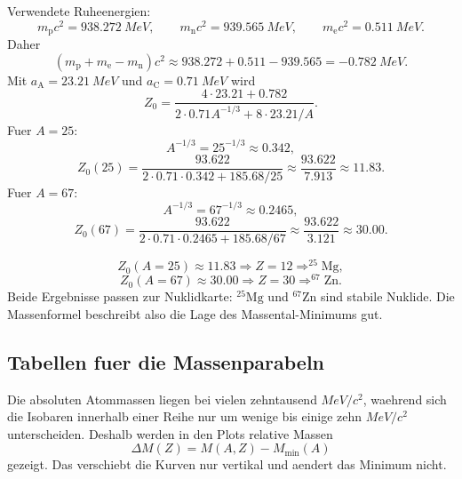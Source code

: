 \documentclass[11pt,a4paper]{scrartcl}
\newcommand{\MeV}{\si{MeV}}
\newcommand{\isotope}[2]{^{#1}\mathrm{#2}}
\theoremstyle{definition}
\theoremstyle{plain}
\theoremstyle{remark}
\newcommand{\aC}{a_{\mathrm C}}
\newcommand{\aA}{a_{\mathrm A}}
\begin{document}
\begin{enumerate}[label=(\alph*)]
    \begin{calculationbox}
    Verwendete Ruheenergien:
    \[
        m_{\mathrm p}c^2=\SI{938.272}{\MeV},\qquad
        m_{\mathrm n}c^2=\SI{939.565}{\MeV},\qquad
        m_{\mathrm e}c^2=\SI{0.511}{\MeV}.
    \]
    Daher
    \[
        (m_{\mathrm p}+m_{\mathrm e}-m_{\mathrm n})c^2
        \approx 938.272+0.511-939.565
        =\SI{-0.782}{\MeV}.
    \]
    Mit $\aA=\SI{23.21}{\MeV}$ und $\aC=\SI{0.71}{\MeV}$ wird
    \[
        Z_0=\frac{4\cdot23.21+0.782}{2\cdot0.71 A^{-1/3}+8\cdot23.21/A}.
    \]
    Fuer $A=25$:
    \[
        A^{-1/3}=25^{-1/3}\approx0.342,
    \]
    \[
        Z_0(25)=\frac{93.622}{2\cdot0.71\cdot0.342+185.68/25}
        \approx\frac{93.622}{7.913}\approx11.83.
    \]
    Fuer $A=67$:
    \[
        A^{-1/3}=67^{-1/3}\approx0.2465,
    \]
    \[
        Z_0(67)=\frac{93.622}{2\cdot0.71\cdot0.2465+185.68/67}
        \approx\frac{93.622}{3.121}\approx30.00.
    \]
    \end{calculationbox}

    \begin{answerbox}
    \[
        \boxed{Z_0(A=25)\approx11.83\Rightarrow Z=12\Rightarrow \isotope{25}{Mg}},
    \]
    \[
        \boxed{Z_0(A=67)\approx30.00\Rightarrow Z=30\Rightarrow \isotope{67}{Zn}}.
    \]
    Beide Ergebnisse passen zur Nuklidkarte: $\isotope{25}{Mg}$ und $\isotope{67}{Zn}$ sind stabile Nuklide. Die Massenformel beschreibt also die Lage des Massental-Minimums gut.
    \end{answerbox}
\end{enumerate}

\subsection{Tabellen fuer die Massenparabeln}

\begin{notebox}[title=Darstellung der Plots]
Die absoluten Atommassen liegen bei vielen zehntausend $\si{\MeV}/c^2$, waehrend sich die Isobaren innerhalb einer Reihe nur um wenige bis einige zehn $\si{\MeV}/c^2$ unterscheiden. Deshalb werden in den Plots relative Massen
\[
    \Delta M(Z)=M(A,Z)-M_{\min}(A)
\]
gezeigt. Das verschiebt die Kurven nur vertikal und aendert das Minimum nicht.
\end{notebox}
\end{document}
